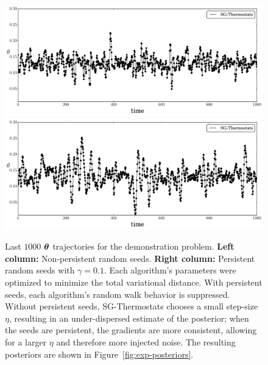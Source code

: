 \documentclass[]{article}
\begin{document}
\begin{figure}[t]
\begin{center}
\includegraphics[width=0.95\columnwidth]{./images/exponential/exp3-SG-Thermostats-theta-timeseries-omega-rate-100p0-chain0.pdf}
\includegraphics[width=0.95\columnwidth]{./images/exponential/exp2-SG-Thermostats-theta-timeseries-omega-rate-0p1-chain3.pdf}
\caption{\small{Last $1000$ ${\bm \theta}$ trajectories for the demonstration problem.  {\bf Left column:} Non-persistent random seeds.  {\bf Right column:} Persistent random seeds with $\gamma = 0.1$.  Each algorithm's parameters were optimized to minimize the total variational distance.  With persistent seeds, each algorithm's random walk behavior is suppressed.  Without persistent seeds, SG-Thermostats chooses a small step-size $\eta$, resulting in an under-dispersed estimate of the posterior; when the seeds are persistent, the gradients are more consistent, allowing for a larger $\eta$ and therefore more injected noise.  The resulting posteriors are shown in Figure~\ref{fig:exp-posteriors}.
}}
\label{fig:exp-theta-traces}
\end{center}
\vskip -0.2in
\end{figure}
\end{document}

